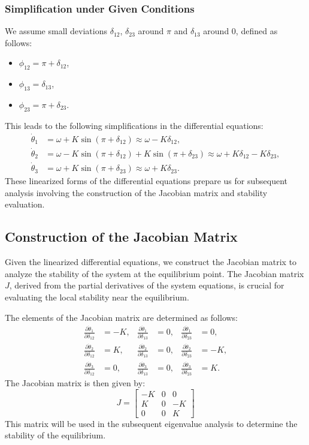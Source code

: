 \documentclass[12pt,a4paper]{article}
\begin{document}
\subsubsection{Simplification under Given Conditions}
We assume small deviations \(\delta_{12}\), \(\delta_{23}\) around \(\pi\) and \(\delta_{13}\) around \(0\), defined as follows:
\begin{itemize}
    \item \(\phi_{12} = \pi + \delta_{12}\),
    \item \(\phi_{13} = \delta_{13}\),
    \item \(\phi_{23} = \pi + \delta_{23}\).
\end{itemize}
This leads to the following simplifications in the differential equations:
\begin{align}
    \dot{\theta}_1 &= \omega + K \sin(\pi + \delta_{12}) \approx \omega - K \delta_{12}, \\
    \dot{\theta}_2 &= \omega - K \sin(\pi + \delta_{12}) + K \sin(\pi + \delta_{23}) \approx \omega + K \delta_{12} - K \delta_{23}, \\
    \dot{\theta}_3 &= \omega + K \sin(\pi + \delta_{23}) \approx \omega + K \delta_{23}.
\end{align}
These linearized forms of the differential equations prepare us for subsequent analysis involving the construction of the Jacobian matrix and stability evaluation.

\subsection{Construction of the Jacobian Matrix}

Given the linearized differential equations, we construct the Jacobian matrix to analyze the stability of the system at the equilibrium point. The Jacobian matrix \(J\), derived from the partial derivatives of the system equations, is crucial for evaluating the local stability near the equilibrium.

The elements of the Jacobian matrix are determined as follows:
\begin{align*}
\frac{\partial \dot{\theta}_1}{\partial \delta_{12}} &= -K, & \frac{\partial \dot{\theta}_1}{\partial \delta_{13}} &= 0, & \frac{\partial \dot{\theta}_1}{\partial \delta_{23}} &= 0, \\
\frac{\partial \dot{\theta}_2}{\partial \delta_{12}} &= K, & \frac{\partial \dot{\theta}_2}{\partial \delta_{13}} &= 0, & \frac{\partial \dot{\theta}_2}{\partial \delta_{23}} &= -K, \\
\frac{\partial \dot{\theta}_3}{\partial \delta_{12}} &= 0, & \frac{\partial \dot{\theta}_3}{\partial \delta_{13}} &= 0, & \frac{\partial \dot{\theta}_3}{\partial \delta_{23}} &= K.
\end{align*}
The Jacobian matrix is then given by:
\[
J = \begin{bmatrix}
-K & 0 & 0 \\
K & 0 & -K \\
0 & 0 & K
\end{bmatrix}
\]
This matrix will be used in the subsequent eigenvalue analysis to determine the stability of the equilibrium.
\end{document}

